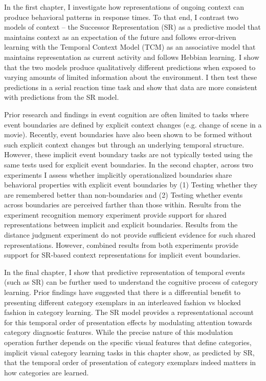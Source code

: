In the first chapter, I investigate how representations of ongoing context can produce behavioral patterns in response times. To that end, I contrast two models of context -- the Successor Representation (SR) as a predictive model that maintains context as an expectation of the future and follows error-driven learning with the Temporal Context Model (TCM) as an associative model that maintains representation as current activity and follows Hebbian learning. I show that the two models produce qualitatively different predictions when exposed to varying amounts of limited information about the environment. I then test these predictions in a serial reaction time task and show that data are more consistent with predictions from the SR model.

Prior research and findings in event cognition are often limited to tasks where event boundaries are defined by explicit context changes (e.g. change of scene in a movie). Recently, event boundaries have also been shown to be formed without such explicit context changes but through an underlying temporal structure. However, these implicit event boundary tasks are not typically tested using the same tests used for explicit event boundaries. In the second chapter, across two experiments I assess whether implicitly operationalized boundaries share behavioral properties with explicit event boundaries by (1) Testing whether they are remembered better than non-boundaries and (2) Testing whether events across boundaries are perceived farther than those within. Results from the experiment recognition memory experiment provide support for shared representations between implicit and explicit boundaries. Results from the distance judgment experiment do not provide sufficient evidence for such shared representations. However, combined results from both experiments provide support for SR-based context representations for implicit event boundaries.

In the final chapter, I show that predictive representation of temporal events (such as SR) can be further used to understand the cognitive process of category learning. Prior findings have suggested that there is a differential benefit to presenting different category exemplars in an interleaved fashion vs blocked fashion in category learning. The SR model provides a representational account for this temporal order of presentation effects by modulating attention towards category diagnostic features. While the precise nature of this modulation operation further depends on the specific visual features that define categories, implicit visual category learning tasks in this chapter show, as predicted by SR, that the temporal order of presentation of category exemplars indeed matters in how categories are learned.


